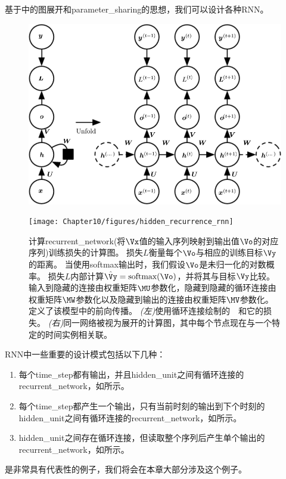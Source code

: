 \section{}
\label{sec:recurrent_neural_networks}
基于中的图展开和\gls{parameter_sharing}的思想，我们可以设计各种\gls{RNN}。
\begin{figure}[!htb]
\ifOpenSource
\centerline{\includegraphics[scale=0.5]{images/91.png}}
\else
\centerline{\texttt{[image: Chapter10/figures/hidden\_recurrence\_rnn]}}
\fi
\caption{计算\gls{recurrent_network}(将$\Vx$值的输入序列映射到输出值$\Vo$的对应序列)训练损失的计算图。
损失$L$衡量每个$\Vo$与相应的训练目标$\Vy$的距离。
当使用softmax输出时，我们假设$\Vo$是未归一化的对数概率。
损失$L$内部计算$\hat{\Vy} = \text{softmax}(\Vo)$，并将其与目标$\Vy$比较。
输入到隐藏的连接由权重矩阵$\MU$参数化，隐藏到隐藏的循环连接由权重矩阵$\MW$参数化以及隐藏到输出的连接由权重矩阵$\MV$参数化。
定义了该模型中的前向传播。
\emph{(左)}使用循环连接绘制的~~和它的损失。
\emph{(右)}同一网络被视为展开的计算图，其中每个节点现在与一个特定的时间实例相关联。
}
\label{fig:chap10_hidden_recurrence_rnn}
\end{figure}

\gls{RNN}中一些重要的设计模式包括以下几种：
\begin{enumerate}
 \item 每个\gls{time_step}都有输出，并且\gls{hidden_unit}之间有循环连接的\gls{recurrent_network}，如所示。
 \item 每个\gls{time_step}都产生一个输出，只有当前时刻的输出到下个时刻的\gls{hidden_unit}之间有循环连接的\gls{recurrent_network}，如所示。
 \item \gls{hidden_unit}之间存在循环连接，但读取整个序列后产生单个输出的\gls{recurrent_network}，如所示。
\end{enumerate}
是非常具有代表性的例子，我们将会在本章大部分涉及这个例子。

